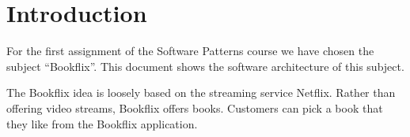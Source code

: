 \chapter*{Introduction}
For the first assignment of the Software Patterns course we have chosen the subject ``Bookflix''. This document shows the software architecture of this subject. 


The Bookflix idea is loosely based on the streaming service Netflix. Rather than offering video streams, Bookflix offers books. Customers can pick a book that they like from the Bookflix application. 